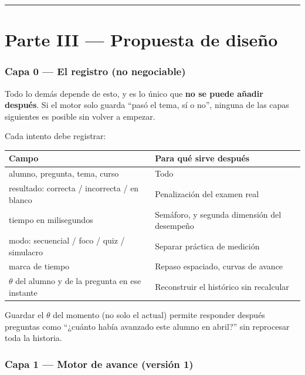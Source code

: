 \documentclass[11pt,a4paper]{article}
\begin{document}
\vspace{10pt}
\hrule
\vspace{14pt}

\part*{Parte III --- Propuesta de diseño}

\section{Capa 0 --- El registro (no negociable)}

Todo lo demás depende de esto, y es lo único que \textbf{no se puede añadir después}. Si el motor solo guarda ``pasó el tema, sí o no'', ninguna de las capas siguientes es posible sin volver a empezar.

Cada intento debe registrar:

\begin{center}
\small
\begin{tabular}{ll}
\toprule
\textbf{Campo} & \textbf{Para qué sirve después} \\
\midrule
alumno, pregunta, tema, curso & Todo \\
resultado: correcta / incorrecta / en blanco & Penalización del examen real \\
tiempo en milisegundos & Semáforo, y segunda dimensión del desempeño \\
modo: secuencial / foco / quiz / simulacro & Separar práctica de medición \\
marca de tiempo & Repaso espaciado, curvas de avance \\
$\theta$ del alumno y de la pregunta en ese instante & Reconstruir el histórico sin recalcular \\
\bottomrule
\end{tabular}
\end{center}

\vspace{6pt}
Guardar el $\theta$ del momento (no solo el actual) permite responder después preguntas como ``¿cuánto había avanzado este alumno en abril?'' sin reprocesar toda la historia.

\section{Capa 1 --- Motor de avance (versión 1)}
\end{document}
